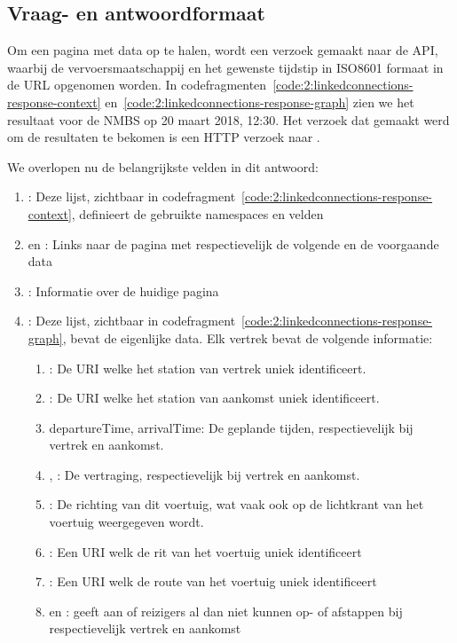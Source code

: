\subsection{Vraag- en antwoordformaat}
Om een pagina met data op te halen, wordt een verzoek gemaakt naar de API, waarbij de vervoersmaatschappij en het gewenste tijdstip in ISO8601 formaat in de URL opgenomen worden. In codefragmenten~\ref{code:2:linkedconnections-response-context} en~\ref{code:2:linkedconnections-response-graph} zien we het resultaat voor de NMBS op 20 maart 2018, 12:30. Het verzoek dat gemaakt werd om de resultaten te bekomen is een HTTP verzoek naar .

We overlopen nu de belangrijkste velden in dit antwoord:
\begin{enumerate}
	\item {}: Deze lijst, zichtbaar in codefragment~\ref{code:2:linkedconnections-response-context}, definieert de gebruikte namespaces en velden
	\item {} en  : Links naar de pagina met respectievelijk de volgende en de voorgaande data
	\item {}: Informatie over de huidige pagina
	\item {}: Deze lijst, zichtbaar in codefragment~\ref{code:2:linkedconnections-response-graph},  bevat de eigenlijke data. Elk vertrek bevat de volgende informatie:
	\begin{enumerate}
			\item {}: De URI welke het station van vertrek uniek identificeert.
			\item {}: De URI welke het station van aankomst uniek identificeert.	\item departureTime, arrivalTime: De geplande tijden, respectievelijk bij vertrek en aankomst.
			\item {}, : De vertraging, respectievelijk bij vertrek en aankomst.
			\item {}: De richting van dit voertuig, wat vaak ook op de lichtkrant van het voertuig weergegeven wordt.
			\item {}: Een URI welk de rit van het voertuig uniek identificeert
			\item {}: Een URI welk de route van het voertuig uniek identificeert
			\item {} en : geeft aan of reizigers al dan niet kunnen op- of afstappen bij respectievelijk vertrek en aankomst
	\end{enumerate}
\end{enumerate}


